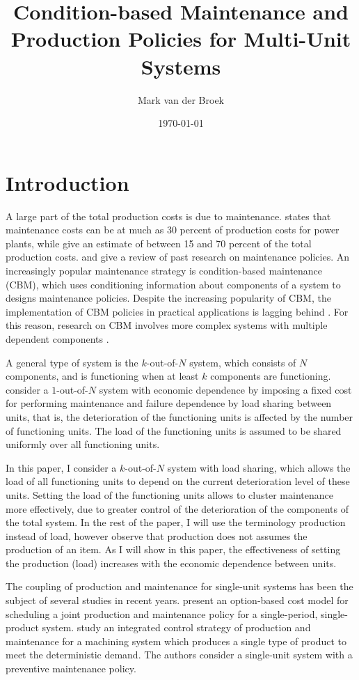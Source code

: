 \documentclass[a4paper,12pt]{article}
\title{Condition-based Maintenance and Production Policies for Multi-Unit Systems}
\author{Mark van der Broek}
\date{\today}
\begin{document}
	
	\maketitle

\section{Introduction}	
A large part of the total production costs is due to maintenance. \cite{GRABER2004861} states that maintenance costs can be at much as 30 percent of production costs for power plants, while \cite{BEVILACQUA200071} give an estimate of between 15 and 70 percent of the total production costs. \cite{wang2002survey} and \cite{ding2015maintenance} give a review of past research on maintenance policies. An increasingly popular maintenance strategy is condition-based maintenance (CBM), which uses conditioning information about components of a system to designs maintenance policies. Despite the increasing popularity of CBM, the implementation of CBM policies in practical applications is lagging behind \citep{keizer2017condition}. For this reason, research on CBM involves more complex systems with multiple dependent components \citep{}. 

A general type of system is the $k$-out-of-$N$ system, which consists of $N$ components, and is functioning when at least $k$ components are functioning. \cite{OLDEKEIZER2018319} consider a $1$-out-of-$N$ system with economic dependence by imposing a fixed cost for performing maintenance and failure dependence by load sharing between units, that is, the deterioration of the functioning units is affected by the number of functioning units. The load of the functioning units is assumed to be shared uniformly over all functioning units. 

In this paper, I consider a $k$-out-of-$N$ system with load sharing, which allows the load of all functioning units to depend on the current deterioration level of these units. Setting the load of the functioning units allows to cluster maintenance more effectively, due to greater control of the deterioration of the components of the total system. In the rest of the paper, I will use the terminology production instead of load, however observe that production does not assumes the production of an item. As I will show in this paper, the effectiveness of setting the production (load) increases with the economic dependence between units. 

The coupling of production and maintenance for single-unit systems has been the subject of several studies in recent years. \cite{doi:10.1080/00207543.2013.843037} present an option-based cost model for scheduling a joint production and maintenance policy for a single-period, single-product system. \cite{doi:10.1080/00207543.2016.1174343} study an integrated control strategy of production and maintenance for a machining system which produces a single type of product to meet the deterministic demand. The authors consider a single-unit system with a preventive maintenance policy. 
\end{document}
